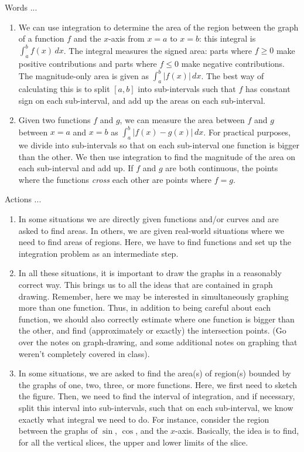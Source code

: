 \documentclass[10pt]{amsart}
\begin{document}
Words ...

\begin{enumerate}

\item We can use integration to determine the area of the region
  between the graph of a function $f$ and the $x$-axis from $x = a$ to
  $x = b$: this integral is $\int_a^b f(x) \, dx$. The integral
  measures the signed area: parts where $f \ge 0$ make positive
  contributions and parts where $f \le 0$ make negative
  contributions. The magnitude-only area is given as $\int_a^b |f(x)|
  \, dx$. The best way of calculating this is to split $[a,b]$ into
  sub-intervals such that $f$ has constant sign on each sub-interval,
  and add up the areas on each sub-interval.
\item Given two functions $f$ and $g$, we can measure the area between
  $f$ and $g$ between $x = a$ and $x = b$ as $\int_a^b |f(x) - g(x)|
  \,dx$. For practical purposes, we divide into sub-intervals so that
  on each sub-interval one function is bigger than the other. We then
  use integration to find the magnitude of the area on each
  sub-interval and add up. If $f$ and $g$ are both continuous, the
  points where the functions {\em cross} each other are points where
  $f = g$.
\end{enumerate}

Actions ...

\begin{enumerate}
\item In some situations we are directly given functions and/or curves
  and are asked to find areas. In others, we are given real-world
  situations where we need to find areas of regions. Here, we have to
  find functions and set up the integration problem as an intermediate
  step.
\item In all these situations, it is important to draw the graphs in a
  reasonably correct way. This brings us to all the ideas that are
  contained in graph drawing. Remember, here we may be interested in
  simultaneously graphing more than one function. Thus, in addition to
  being careful about each function, we should also correctly estimate
  where one function is bigger than the other, and find (approximately
  or exactly) the intersection points. (Go over the notes on
  graph-drawing, and some additional notes on graphing that weren't
  completely covered in class).
\item In some situations, we are asked to find the area(s) of
  region(s) bounded by the graphs of one, two, three, or more
  functions. Here, we first need to sketch the figure. Then, we need
  to find the interval of integration, and if necessary, split this
  interval into sub-intervals, such that on each sub-interval, we know
  exactly what integral we need to do. For instance, consider the
  region between the graphs of $\sin$, $\cos$, and the
  $x$-axis. Basically, the idea is to find, for all the vertical
  slices, the upper and lower limits of the slice.
\end{enumerate}
\end{document}
